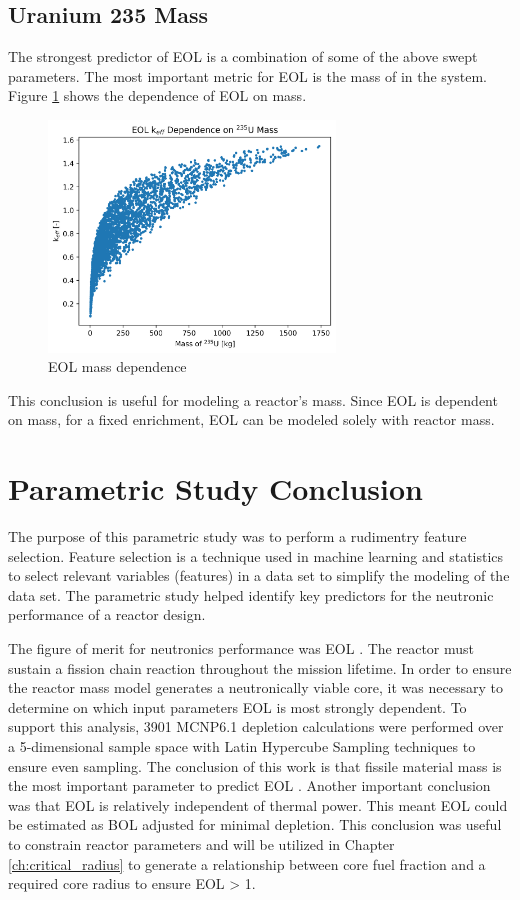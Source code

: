 \subsection{Uranium 235 Mass}
The strongest predictor of EOL \keff is a combination of some of the above
swept parameters. The most important metric for EOL \keff is the mass of \uran
in the system. Figure \ref{fig:eol_keff_vs_235_mass} shows the dependence of EOL
\keff on \uran mass.

\begin{figure}[h]
    \centering
    \includegraphics[width=3in]{../images/keff_vs_mass_235.png}
\caption{EOL \keff \uran mass dependence}
\label{fig:eol_keff_vs_235_mass}
\end{figure}

This conclusion is useful for modeling a reactor's mass. Since EOL \keff is
dependent on \uran mass, for a fixed enrichment, EOL \keff can be modeled 
solely with reactor mass.

\section{Parametric Study Conclusion}
The purpose of this parametric study was to perform a rudimentry feature
selection. Feature selection is a technique used in machine learning and
statistics to select relevant variables (features) in a data set to simplify the
modeling of the data set. The parametric study helped identify key predictors
for the neutronic performance of a reactor design.

The figure of merit for neutronics performance was EOL \keff. The reactor must
sustain a fission chain reaction throughout the mission lifetime. In order to
ensure the reactor mass model generates a neutronically viable core, it was
necessary to determine on which input parameters EOL \keff is most strongly
dependent. To support this analysis, 3901 MCNP6.1 depletion calculations were
performed over a 5-dimensional sample space with Latin Hypercube Sampling
techniques to ensure even sampling. The conclusion of this work is that fissile
material mass is the most important parameter to predict EOL \keff. Another
important conclusion was that EOL \keff is relatively independent of thermal power. This
meant EOL \keff could be estimated as BOL \keff adjusted for minimal depletion.
This conclusion was useful to constrain reactor parameters and will be utilized
in Chapter \ref{ch:critical_radius} to generate a relationship between core fuel fraction
and a required core radius to ensure EOL \keff > 1.
